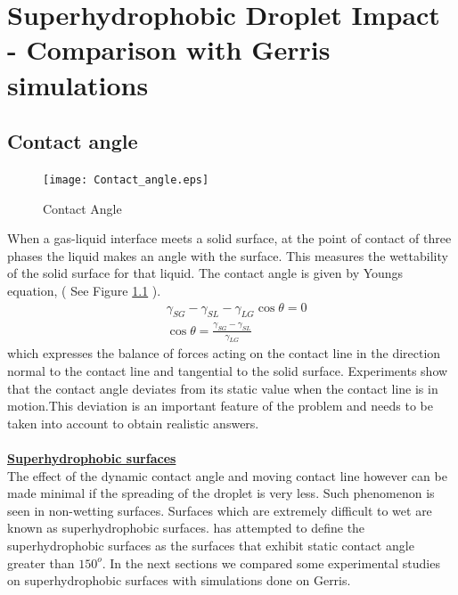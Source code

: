 
\chapter{Superhydrophobic Droplet Impact - Comparison with Gerris simulations}

\section{Contact angle}
\begin{figure}
  \begin{center}
    \texttt{[image: Contact\_angle.eps]}
  \end{center}
  \caption{Contact Angle}
  \label{Fig:Contact_angle}
\end{figure}
When a gas-liquid interface meets a solid surface, at the point of contact of three phases the liquid makes an angle with the surface. This measures the wettability of 
the solid surface for that liquid. The contact angle is given by Youngs equation, ( See Figure \ref{Fig:Contact_angle} ). 
\begin{equation}
 \boxed{ \begin{align}
 &\gamma_{SG} -\gamma_{SL} - \gamma_{LG} \cos \theta =0  \\
 &\cos \theta =\frac{\gamma_{SG} -\gamma_{SL}}{\gamma_{LG}} 
 \end{align}
 }
 \label{Eq:youngs}
\end{equation}
which expresses the balance of forces acting on the contact line in the direction normal to the contact line and tangential
to the solid surface. Experiments show that the contact angle deviates from its static value when
the contact line is in motion.This deviation is an important feature of the problem and needs to be taken into account to obtain realistic answers. \\
\\
\underline{\textbf{Superhydrophobic surfaces}}\\
The effect of the dynamic contact angle and moving contact line however can be made minimal if the spreading of the droplet is very less. Such phenomenon is seen in non-wetting surfaces. 
Surfaces which are extremely difficult to wet are known as superhydrophobic surfaces. \cite{wang2007definition} has attempted to define the superhydrophobic surfaces as the
surfaces that exhibit static contact angle greater than $150^o$. In the next sections we compared some experimental studies on superhydrophobic surfaces with simulations done on Gerris.

